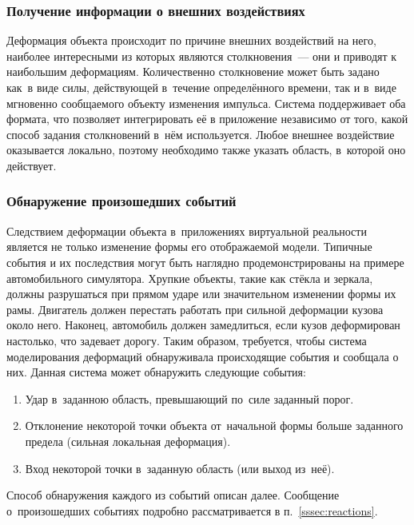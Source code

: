 \documentclass[a4paper, 14pt, titlepage]{extarticle}
\begin{document}
      \subsubsection{Получение информации о внешних воздействиях}\label{sssec:external_forces}

        Деформация объекта происходит по причине внешних воздействий на него, наиболее интересными
        из которых являются столкновения~--- они и приводят к наибольшим деформациям. Количественно
        столкновение может быть задано как~в виде силы, действующей в~течение определённого времени, так и
        в~виде мгновенно сообщаемого объекту изменения импульса.
        Система поддерживает оба формата, что позволяет интегрировать её в приложение независимо от
        того, какой способ задания столкновений в~нём используется.
        Любое внешнее воздействие оказывается локально, поэтому необходимо также указать область,
        в~которой оно действует.

      \subsubsection{Обнаружение произошедших событий}\label{sssec:events}

        Следствием деформации объекта в~приложениях виртуальной реальности является не только
        изменение формы его отображаемой модели. Типичные события и их последствия могут быть
        наглядно продемонстрированы на примере автомобильного симулятора. Хрупкие объекты, такие как
        стёкла и зеркала, должны разрушаться при прямом ударе или значительном изменении формы их
        рамы. Двигатель должен перестать работать при сильной деформации кузова около него.
        Наконец, автомобиль должен замедлиться, если кузов деформирован настолько, что задевает
        дорогу. Таким образом, требуется, чтобы система моделирования деформаций обнаруживала
        происходящие события и сообщала о них. Данная система может обнаружить следующие события:
        \begin{enumerate}
          \item Удар в~заданною область, превышающий по~силе заданный порог.
          \item Отклонение некоторой точки объекта от~начальной формы больше заданного предела
          (сильная локальная деформация).
          \item Вход некоторой точки в~заданную область (или выход из~неё).
        \end{enumerate}
        Способ обнаружения каждого из событий описан далее. Сообщение о~произошедших событиях
        подробно рассматривается в п.~\ref{sssec:reactions}.
\end{document}
